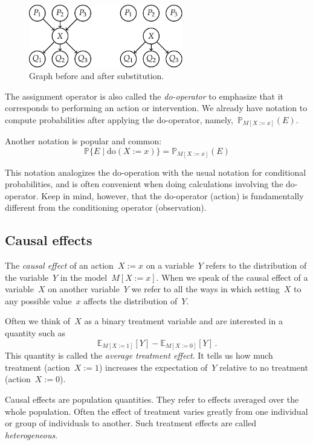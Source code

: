 \documentclass{tufte-book}
\begin{document}
\begin{figure}
\centering
\includegraphics[width=0.6\textwidth,height=\textheight]{assets/causal-sub}
\caption{Graph before and after substitution.}
\end{figure}

The assignment operator is also called the
\emph{do-operator} to emphasize that it corresponds
to performing an action or intervention. We already have notation to
compute probabilities after applying the do-operator,
namely,~\(\mathbb{P}_{M[X:=x]}(E).\)

Another notation is popular and common: \[
\mathbb{P}\{E\mid \mathrm{do}(X:=x)\} = \mathbb{P}_{M[X:=x]}(E)
\]

This notation analogizes the do-operation with the usual notation for
conditional probabilities, and is often convenient when doing
calculations involving the do-operator. Keep in mind, however, that the
do-operator (action) is fundamentally different from the conditioning
operator (observation).

\hypertarget{causal-effects}{%
\subsection{Causal effects}\label{causal-effects}}

The \emph{causal effect} of an action~\(X:=x\) on a variable~\(Y\)
refers to the distribution of the variable~\(Y\) in the
model~\(M[X:=x].\) When we speak of the causal effect of a
variable~\(X\) on another variable~\(Y\) we refer to all the ways in
which setting~\(X\) to any possible value~\(x\) affects the distribution
of~\(Y\).

Often we think of~\(X\) as a binary treatment variable and are
interested in a quantity such as \[
\mathbb{E}_{M[X:=1]}[Y] - \mathbb{E}_{M[X:=0]}[Y]\,.
\] This quantity is called the \emph{average treatment
effect}. It tells us how much treatment
(action~\(X:=1\)) increases the expectation of~\(Y\) relative to no
treatment (action~\(X:=0\)).

Causal effects are population quantities. They refer to effects averaged
over the whole population. Often the effect of treatment varies greatly
from one individual or group of individuals to another. Such treatment
effects are called \emph{heterogeneous}.
\end{document}
